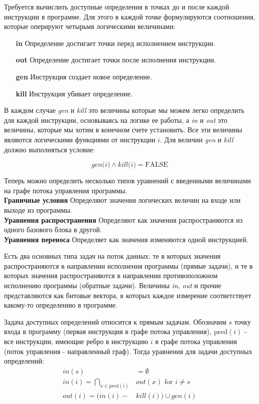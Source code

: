 \documentclass{mipt-thesis-bs}
\begin{document}
    Требуется вычислить доступные определения в точках до и после каждой инструкции в программе. Для этого в каждой точке формулируются соотношения, которые оперируют четырьмя логическими величинами:

    \begin{itemize}
        \item[\textbf{in}] Определение достигает точки перед исполнением инструкции.
        \item[\textbf{out}] Определение достигает точки после исполнения инструкции.
        \item[\textbf{gen}] Инструкция создает новое определение.
        \item[\textbf{kill}] Инструкция убивает определение.
    \end{itemize}

    В каждом случае \textit{gen} и \textit{kill} это величины которые мы можем легко определить для каждой инструкции, основываясь на логике ее работы, а \textit{in} и \textit{out} это величины, которые мы хотим в конечном счете установить. Все эти величины являются логическими функциями от инструкции $i$. Для величин \textit{gen} и \textit{kill} должно выполняться условие:

    $$\textit{gen(i)} \wedge \textit{kill(i)} = \text{FALSE}$$

    Теперь можно определить несколько типов уравнений с введенными величинами на графе потока управления программы.\\
    \textbf{Граничные условия} Определяют значения логических величин на входе или выходе из программы.\\
    \textbf{Уравнения распространения} Определяют как значения распространяются из одного базового блока в другой.\\
    \textbf{Уравнения переноса} Определяет как значения изменяются одной инструкцией.

    Есть два основных типа задач на поток данных: те в которых значения распространяются в направлении исполнения программы (прямые задачи), и те в которых значения распространяются в направлении противоположном исполнению программы (обратные задачи). Величины \textit{in}, \textit{out} и прочие представляются как битовые вектора, в которых каждое измерение соответствует какому-то определению в программе.

    Задача доступных определений относится к прямым задачам. Обозначим $s$ точку входа в программу (первая инструкция в графе потока управления), $\text{pred}(i)$ - все инструкции, имеющие ребро в инструкцию $i$ в графе потока управления (поток управления - направленный граф). Тогда уравнения для задачи доступных определений:
    \begin{align*}
        in(s) &= \emptyset \\
        in(i) = \bigcap_{x \in \text{pred}(i)}&out(x) \text{ for } i \neq s\\
        out(i) = (in(i) - &kill(i)) \cup gen(i)
    \end{align*}
\end{document}
